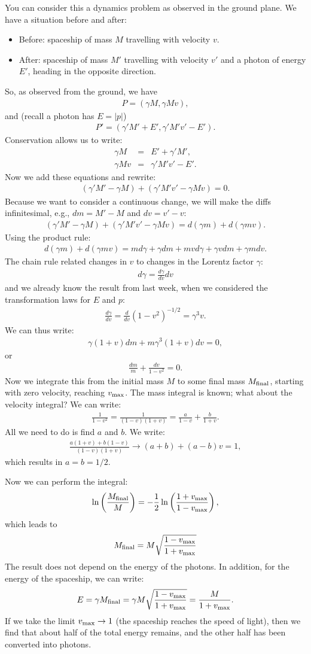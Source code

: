 \documentclass[12pt]{article}
\newcommand{\be}{\begin{eqnarray}}
\newcommand{\ee}{\end{eqnarray}}
\begin{document}
You can consider this a dynamics problem as observed in the ground plane. We have a situation before and after:
\begin{itemize}
\item Before: spaceship of mass $M$ travelling with velocity $v$.  
\item After: spaceship of mass $M'$ travelling with velocity $v'$ and a photon of energy $E'$, heading in the opposite direction.  
\end{itemize}

So, as observed from the ground, we have 
\be
P = (\gamma M, \gamma M v),
\ee
and (recall a photon has $E = |p|$)
\be
P' = (\gamma'M' + E', \gamma' M' v' - E').
\ee
Conservation allows us to write:
\be
\gamma M &=& E'+\gamma'M' , \\
\gamma M v &=& \gamma'M'v' -E'.
\ee
Now we add these equations and rewrite:
\be
(\gamma'M' - \gamma M) + (\gamma'M'v' - \gamma M v)=0. 
\ee
Because we want to consider a continuous change, we will make the diffs infinitesimal, e.g., $dm = M' - M$ and $dv = v' - v$: 
\be
(\gamma'M' - \gamma M) + (\gamma'M'v' - \gamma M v) = d(\gamma m) + d(\gamma m v). 
\ee
Using the product rule:
\be
d(\gamma m) + d(\gamma m v) = m d\gamma + \gamma dm + m v d\gamma + \gamma v dm + \gamma m  dv. 
\ee
The chain rule related changes in $v$ to changes in the Lorentz factor $\gamma$:
\be
d \gamma = \frac{d\gamma}{dv} dv 
\ee
and we already know the result from last week, when we considered the transformation laws for $E$ and $p$:
\be
\frac{d \gamma}{ dv} = \frac{d}{dv} (1-v^2)^{-1/2} = \gamma^3 v.
\ee
We can thus write:
\be
\gamma(1+v) dm + m \gamma^3 (1+v) dv = 0,
\ee
or 
\be
\frac{dm}{m} + \frac{dv}{1-v^2} = 0. 
\ee
Now we integrate this from the initial mass $M$ to some final mass $M_{\rm final}$, starting with zero velocity, reaching $v_{\rm max}$. The mass integral is known; what about the velocity integral? We can write:
\be
\frac{1}{1-v^2} = \frac{1}{(1-v)(1+v)} = \frac{a}{1-v} + \frac{b}{1+v}. 
\ee 
All we need to do is find $a$ and $b$. We write:
\be
\frac{a(1+v) + b(1-v)}{(1-v)(1+v)} \rightarrow (a+b) + (a-b) v = 1, 
\ee
which results in $a = b = 1/2$. 

Now we can perform the integral:
\be
\ln \left( \frac{M_{\rm final}}{M}\right) = -\frac{1}{2} \ln \left( \frac{1+v_{\rm max}}{1-v_{\rm max}}\right),
\ee
which leads to 
\be
M_{\rm final} = M \sqrt{\frac{1-v_{\rm max}}{1+v_{\rm max}}}\label{eq:RM}
\ee
The result does not depend on the energy of the photons. In addition, for the energy of the spaceship, we can write:
\be
E= \gamma M_{\rm final} = \gamma M \sqrt{\frac{1-v_{\rm max}}{1+v_{\rm max}}} = \frac{M}{1+v_{\rm max}}. 
\ee
If we take the limit $v_{\rm max} \rightarrow 1$ (the spaceship reaches the speed of light), then we find that about half of the total energy remains, and the other half has been converted into photons. 
\end{document}
